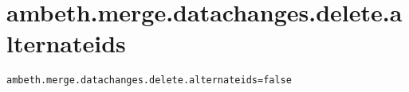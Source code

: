 \section{ambeth.merge.datachanges.delete.alternateids}
\label{configuration:AmbethMergeDatachangesDeleteAlternateids}
\AvailableInJavaOnly{\TODO}
\begin{lstlisting}[style=Props,caption={Usage example for \textit{ambeth.merge.datachanges.delete.alternateids}}]
ambeth.merge.datachanges.delete.alternateids=false
\end{lstlisting}